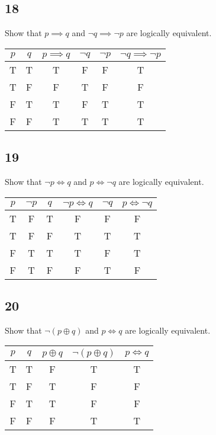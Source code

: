 \documentclass{article}
\begin{document}
\subsection{18}

Show that $ p \implies q $ and $ \neg q \implies \neg p $ are logically equivalent.

\begin{tabular}{ | c | c | c | c | c | c | }
	$ p $ & $ q $ & $ p \implies q $ & $ \neg q $ & $ \neg p $ & $ \neg q \implies \neg p $ \\
	\hline
	T & T & T & F & F & T \\
	T & F & F & T & F & F \\
	F & T & T & F & T & T \\
	F & F & T & T & T & T \\
\end{tabular}

\subsection{19}

Show that $ \neg p \iff q $ and $ p \iff \neg q $ are logically equivalent.

\begin{tabular}{ | c | c | c | c | c | c | }
	$ p $ & $ \neg p $ & $ q $ & $ \neg p \iff q $ & $ \neg q $ & $ p \iff \neg q $ \\
	\hline
	T & F & T & F & F & F \\
	T & F & F & T & T & T \\
	F & T & T & T & F & T \\
	F & T & F & F & T & F \\
\end{tabular}

\subsection{20}

Show that $ \neg ( p \oplus q ) $ and $ p \iff q $ are logically equivalent.

\begin{tabular}{ | c | c | c | c | c | }
	$ p $ & $ q $ & $ p \oplus q $ & $ \neg ( p \oplus q ) $ & $ p \iff q $ \\
	\hline
	T & T & F & T & T \\
	T & F & T & F & F \\
	F & T & T & F & F \\
	F & F & F & T & T \\
\end{tabular}
\end{document}
